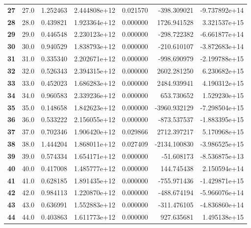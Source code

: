 \documentclass{report}[12pt]
\begin{document}
\begin{center}
\begin{tabular}{lrrrrrr}
\textbf{27  } &           27.0 &   1.252463 &  2.444808e+12 &    0.021570 &  -398.309021 & -9.737892e+14 \\
\textbf{28  } &           28.0 &   0.439821 &  1.923364e+12 &    0.000000 &  1726.941528 &  3.321537e+15 \\
\textbf{29  } &           29.0 &   0.446548 &  2.230123e+12 &    0.000000 &  -298.722382 & -6.661877e+14 \\
\textbf{30  } &           30.0 &   0.940529 &  1.838793e+12 &    0.000000 &  -210.610107 & -3.872683e+14 \\
\textbf{31  } &           31.0 &   0.335340 &  2.202671e+12 &    0.000000 &  -998.690979 & -2.199788e+15 \\
\textbf{32  } &           32.0 &   0.526343 &  2.394315e+12 &    0.000000 &  2602.281250 &  6.230682e+15 \\
\textbf{33  } &           33.0 &   0.452023 &  1.686283e+12 &    0.000000 &  2484.939941 &  4.190312e+15 \\
\textbf{34  } &           34.0 &   0.960583 &  2.339236e+12 &    0.000000 &   653.730652 &  1.529230e+15 \\
\textbf{35  } &           35.0 &   0.148658 &  1.842623e+12 &    0.000000 & -3960.932129 & -7.298504e+15 \\
\textbf{36  } &           36.0 &   0.533222 &  2.156055e+12 &    0.000000 &  -873.537537 & -1.883395e+15 \\
\textbf{37  } &           37.0 &   0.702346 &  1.906420e+12 &    0.029866 &  2712.397217 &  5.170968e+15 \\
\textbf{38  } &           38.0 &   1.444204 &  1.868011e+12 &    0.027409 & -2134.100830 & -3.986525e+15 \\
\textbf{39  } &           39.0 &   0.574334 &  1.654171e+12 &    0.000000 &   -51.608173 & -8.536875e+13 \\
\textbf{40  } &           40.0 &   0.417008 &  1.485777e+12 &    0.000000 &   144.745438 &  2.150594e+14 \\
\textbf{41  } &           41.0 &   0.628185 &  1.891435e+12 &    0.000000 &  -755.971436 & -1.429871e+15 \\
\textbf{42  } &           42.0 &   0.984113 &  1.220870e+12 &    0.000000 &  -488.674194 & -5.966076e+14 \\
\textbf{43  } &           43.0 &   0.636991 &  1.552883e+12 &    0.000000 &  -311.476105 & -4.836860e+14 \\
\textbf{44  } &           44.0 &   0.403863 &  1.611773e+12 &    0.000000 &   927.635681 &  1.495138e+15 \\

\end{tabular}
\end{center}
\end{document}
